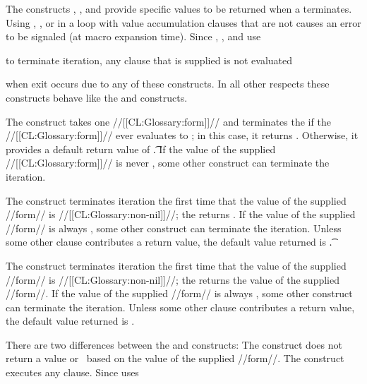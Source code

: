 The constructs , , and  provide specific values to be returned when a  terminates.   Using , , or  in a loop with  value accumulation clauses that are not  causes  an error  to be signaled (at macro expansion time). Since , , and  use   

to terminate iteration, any  clause that is supplied is not evaluated

when exit occurs due to any of these constructs. In all other respects these constructs behave like the  and  constructs.

  The  construct takes one //[[CL:Glossary:form]]// and terminates the  
  if the //[[CL:Glossary:form]]// ever evaluates to \nil; in this case, it returns
  \nil.  Otherwise, it provides a default return value of \t. If the value of the supplied //[[CL:Glossary:form]]// is never \nil, some other construct can terminate the iteration.
 

The  construct terminates iteration the first time that the value of the supplied //form// is //[[CL:Glossary:non-nil]]//; the  returns  \nil.                                          If the value of the supplied //form// is always  \nil, some other  construct can terminate the iteration.   Unless some other clause contributes  a return value, the default value returned is \t.
 

The  construct terminates iteration the first time that the value of the supplied //form// is //[[CL:Glossary:non-nil]]//; the  returns the value of the supplied //form//. If the value of the supplied //form//  is always  \nil, some other construct can terminate the iteration.  Unless some other clause contributes a  return value, the default value returned is \nil.
 
 

There are two differences between the  and  constructs: 
  \beginlist \itemitem{\bull} The  construct does not return a value or  \nil\ based on the value of the supplied //form//.
  \itemitem{\bull} The  construct executes  any  clause. Since  uses  

